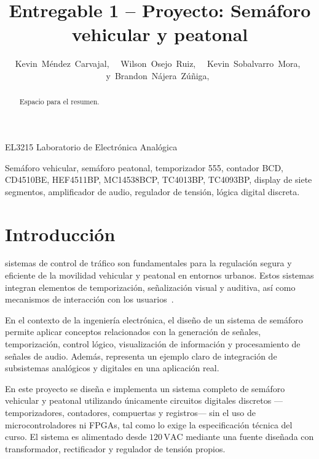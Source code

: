 \documentclass[journal]{IEEEtran}
\begin{document}
\title{Entregable 1 -- Proyecto: Semáforo vehicular y peatonal}

\author{Kevin~Méndez~Carvajal,~
        ~Wilson~Osejo~Ruiz,~
        ~Kevin~Sobalvarro~Mora,~
        y~Brandon~Nájera~Zúñiga,~}

%
{EL3215 Laboratorio de Electrónica Analógica}

\maketitle

\begin{abstract}
Espacio para el resumen.
\end{abstract}

\begin{IEEEkeywords}
Semáforo vehicular, semáforo peatonal, temporizador 555, contador BCD, CD4510BE,
HEF4511BP, MC14538BCP, TC4013BP, TC4093BP, display de siete segmentos, amplificador
de audio, regulador de tensión, lógica digital discreta.
\end{IEEEkeywords}

\section{Introducción}

 sistemas de control de tráfico son fundamentales para la regulación
segura y eficiente de la movilidad vehicular y peatonal en entornos urbanos. Estos sistemas
integran elementos de temporización, señalización visual y auditiva, así como mecanismos
de interacción con los usuarios~\cite{Floyd2008}.

En el contexto de la ingeniería electrónica, el diseño de un sistema de semáforo permite
aplicar conceptos relacionados con la generación de señales, temporización, control lógico,
visualización de información y procesamiento de señales de audio. Además, representa un
ejemplo claro de integración de subsistemas analógicos y digitales en una aplicación real.

En este proyecto se diseña e implementa un sistema completo de semáforo vehicular y
peatonal utilizando únicamente circuitos digitales discretos —temporizadores, contadores,
compuertas y registros— sin el uso de microcontroladores ni FPGAs, tal como lo exige la
especificación técnica del curso. El sistema es alimentado desde $120\,\text{VAC}$
mediante una fuente diseñada con transformador, rectificador y regulador de tensión
propios.
\end{document}
